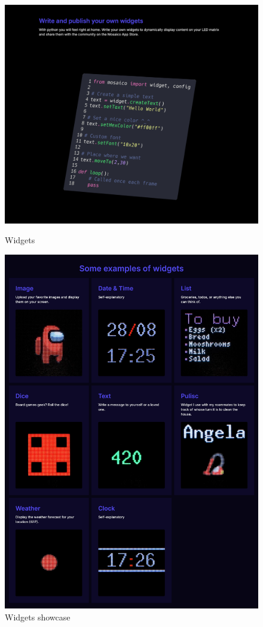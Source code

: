 \begin{figure}[H]
\centering
\begin{minipage}[b]{0.49\textwidth}
\centering
\includegraphics[width=\textwidth]{tesi/img/website_demo/landing/3.png}
\caption*{Widgets}
\end{minipage}
\begin{minipage}[b]{0.49\textwidth}
\centering
\includegraphics[width=\textwidth]{tesi/img/website_demo/landing/4.png}
\caption*{Widgets showcase}
\end{minipage}
\end{figure}

